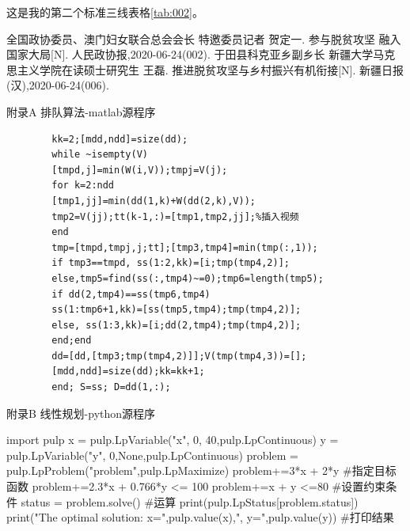 \documentclass[a4paper,12pt]{ctexart} %
\let\heiti\relax
\begin{document}
    这是我的第二个标准三线表格\ref{tab:002}。%
    


    \begin{thebibliography}{99}
        
         全国政协委员、澳门妇女联合总会会长  特邀委员记者  贺定一.  参与脱贫攻坚  融入国家大局[N].  人民政协报,2020-06-24(002).
         于田县科克亚乡副乡长  新疆大学马克思主义学院在读硕士研究生  王磊.  推进脱贫攻坚与乡村振兴有机衔接[N].  新疆日报(汉),2020-06-24(006). 
    \end{thebibliography}

    \newpage
    \begin{center}
	   \centering
        {\heiti \Large 附录A \quad 排队算法-matlab源程序 \\}  
    \end{center}
    \begin{lstlisting}
        kk=2;[mdd,ndd]=size(dd);
        while ~isempty(V)
        [tmpd,j]=min(W(i,V));tmpj=V(j);
        for k=2:ndd
        [tmp1,jj]=min(dd(1,k)+W(dd(2,k),V));
        tmp2=V(jj);tt(k-1,:)=[tmp1,tmp2,jj];%插入视频
        end
        tmp=[tmpd,tmpj,j;tt];[tmp3,tmp4]=min(tmp(:,1));
        if tmp3==tmpd, ss(1:2,kk)=[i;tmp(tmp4,2)];
        else,tmp5=find(ss(:,tmp4)~=0);tmp6=length(tmp5);
        if dd(2,tmp4)==ss(tmp6,tmp4)
        ss(1:tmp6+1,kk)=[ss(tmp5,tmp4);tmp(tmp4,2)];
        else, ss(1:3,kk)=[i;dd(2,tmp4);tmp(tmp4,2)];
        end;end
        dd=[dd,[tmp3;tmp(tmp4,2)]];V(tmp(tmp4,3))=[];
        [mdd,ndd]=size(dd);kk=kk+1;
        end; S=ss; D=dd(1,:);
    \end{lstlisting}

    \begin{center}
	   \centering
        {\heiti \Large 附录B \quad 线性规划-python源程序 \\}  
    \end{center}
    \begin{python}
        import pulp
        x = pulp.LpVariable("x", 0, 40,pulp.LpContinuous)
        y = pulp.LpVariable("y", 0,None,pulp.LpContinuous)
        problem = pulp.LpProblem("problem",pulp.LpMaximize)
        problem+=3*x + 2*y        #指定目标函数  
        problem+=2.3*x + 0.766*y <= 100
        problem+=x + y <=80      #设置约束条件
        status = problem.solve()  #运算
        print(pulp.LpStatus[problem.status])
        print("The optimal solution: x=",pulp.value(x),",
             y=",pulp.value(y))   #打印结果
    \end{python}
\end{document}
